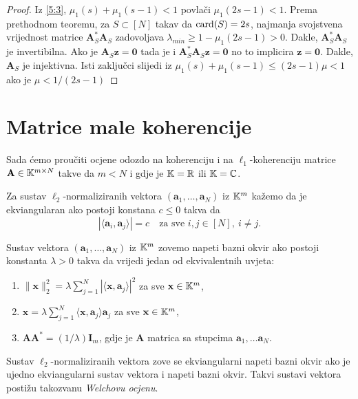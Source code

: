 \documentclass[a4paper,twoside,12pt]{memoir} %
\newcommand{\vect}[1]{\mathbf{#1}}
\renewcommand{\vec}{\vect}
\newcommand{\card}{\text{\normalfont{card}}}
\newcommand{\norm}[1]{\|{#1}\|}
\begin{document}
\begin{proof}
    Iz \eqref{5:3}, $\mu_1(s) + \mu_1(s-1) < 1$ povla\v{c}i $\mu_1(2s-1) < 1$. Prema prethodnom teoremu, za $S \subset [N]$ takav da $\card(S) = 2s$, najmanja svojstvena vrijednost matrice $\vec A^*_S \vec A_S$ zadovoljava $\lambda_{min} \geq 1 - \mu_1(2s-1)>0$. Dakle, $\vec A^*_S \vec A_S$ je invertibilna. Ako je $\vec A_S \vec z = \vec 0$ tada je i $\vec A^*_S \vec A_S \vec z = \vec 0$ no to implicira $\vec z = \vec 0$. Dakle, $\vec A_S$ je injektivna. Isti zaklju\v{c}ci slijedi iz $\mu_1(s) + \mu_1(s-1) \leq (2s-1)\mu < 1$ ako je $\mu < 1/(2s-1)$
\end{proof}

\section[Matrice male koherencije][Matrice male koherencije]{Matrice male koherencije}
Sada \'cemo prou\v{c}iti ocjene odozdo na koherenciju i na $\ell_1$-koherenciju matrice $\vec A \in \K^{m \times N}$ takve da $m < N$ i gdje je $\mathbb{K} = \mathbb{R}$ ili $\mathbb{K} = \mathbb{C}$.
\begin{defn}
    Za sustav $\ell_2$-normaliziranih vektora $(\vec a_1, \dots, \vec a_N)$ iz $\mathbb{K}^m$ ka\v{z}emo da je ekviangularan ako postoji konstana $c \leq 0$ takva da
    \begin{equation*}
        |\langle \vec a_i, \vec a_j \rangle|  = c \quad \text{za sve } i,j \in [N],\ i \neq j.
    \end{equation*}
\end{defn}
\begin{defn}
    Sustav  vektora $(\vec a_1, \dots, \vec a_N)$ iz $\mathbb{K}^m$ zovemo napeti bazni okvir ako postoji konstanta $\lambda > 0$ takva da vrijedi jedan od ekvivalentnih uvjeta:
    \begin{enumerate}[label=(\alph*)]
        \item $\norm{\vec x}_2^2 = \lambda \sum_{j=1}^N |\langle \vec x, \vec a_j \rangle|^2$ za sve $\vec x \in \K^m$,
        \item $\vec{x} = \lambda \sum_{j=1}^N \langle \vec x, \vec a_j\rangle \vec a_j$  za sve $\vec x \in \K^m$,
        \item $\vec{AA}^* = (1/\lambda) \vec I_m$, gdje je $\vec A$ matrica sa stupcima $\vec a_1, \dots \vec a_N$.
    \end{enumerate}
\end{defn}
Sustav $\ell_2$-normaliziranih vektora zove se ekviangularni napeti bazni okvir ako je ujedno ekviangularni sustav vektora i napeti bazni okvir. Takvi sustavi vektora posti\v{z}u takozvanu \textit{Welchovu ocjenu}.
\end{document}
